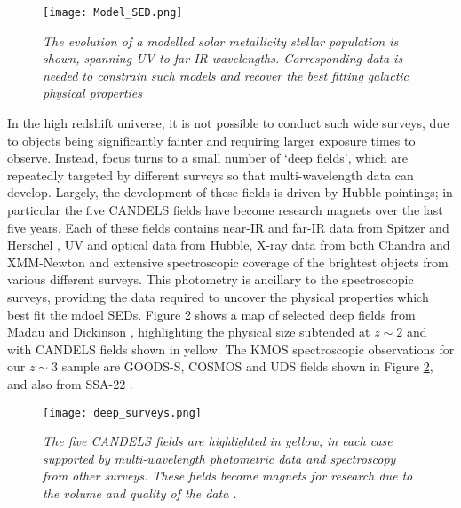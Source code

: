\documentclass{literature}
\begin{document}
\begin{figure}[!htp]
\centering
\texttt{[image: Model\_SED.png]}
\caption{\footnotesize{\emph{The evolution of a modelled solar metallicity stellar population is shown, spanning UV to far-IR wavelengths. Corresponding data is needed to constrain such models and recover the best fitting galactic physical properties \citep{Bruzual2003}}}}
\label{fig:mod_sed}
\end{figure}

In the high redshift universe, it is not possible to conduct such wide surveys, due to objects being significantly fainter and requiring larger exposure times to observe. Instead, focus turns to a small number of `deep fields', which are repeatedly targeted by different surveys so that multi-wavelength data can develop. Largely, the development of these fields is driven by Hubble pointings; in particular the five CANDELS fields \citep{Grogin2011} have become research magnets over the last five years. Each of these fields contains near-IR and far-IR data from Spitzer \citep{Werner2004} and Herschel \citep{Pilbratt2010}, UV and optical data from Hubble, X-ray data from both Chandra \citep{Giacconi2001} and XMM-Newton \citep{Jansen2001} and extensive spectroscopic coverage of the brightest objects from various different surveys. This photometry is ancillary to the spectroscopic surveys, providing the data required to uncover the physical properties which best fit the mdoel SEDs. Figure \ref{fig:deep_surveys} shows a map of selected deep fields from Madau and Dickinson \citep{Madau_2014}, highlighting the physical size subtended at $z\sim 2$ and with CANDELS fields shown in yellow. The KMOS spectroscopic observations for our $z \sim 3$ sample are GOODS-S, COSMOS and UDS fields shown in Figure \ref{fig:deep_surveys}, and also from SSA-22 \citep{Lehmer2009}. \\ 

\begin{figure}[!htp]
\centering
\texttt{[image: deep\_surveys.png]}
\caption{\footnotesize{\emph{The five CANDELS fields are highlighted in yellow, in each case supported by multi-wavelength photometric data and spectroscopy from other surveys. These fields become magnets for research due to the volume and quality of the data \citep{Madau_2014}.}}}
\label{fig:deep_surveys}
\end{figure} 
\end{document}
